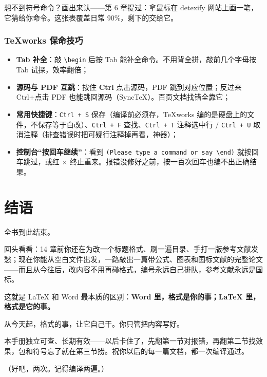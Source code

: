 \begin{notebox}
想不到符号命令？画出来认——第 6 章提过：拿鼠标在 detexify 网站上画一笔，它猜给你命令。这张表覆盖日常 90\%，剩下的交给它。
\end{notebox}

\subsubsection*{TeXworks 保命技巧}

\begin{itemize}
\setlength{\itemsep}{2pt}
\item \textbf{Tab 补全}：敲 \texttt{\textbackslash{}begin} 后按 Tab 能补全命令。不用背全拼，敲前几个字母按 Tab 试探，效率翻倍；
\item \textbf{源码与 PDF 互跳}：按住 \textbf{Ctrl} 点击源码，PDF 跳到对应位置；反过来 Ctrl+点击 PDF 也能跳回源码（SyncTeX）。百页文档找错全靠它；
\item \textbf{常用快捷键}：\texttt{Ctrl + S} 保存（编译前必须存，TeXworks 编的是硬盘上的文件，不保存等于白改）、\texttt{Ctrl + F} 查找、\texttt{Ctrl + T} 注释选中行 / \texttt{Ctrl + U} 取消注释（排查错误时把可疑行注释掉再看，神器）；
\item \textbf{控制台“按回车继续”}：看到 \texttt{(Please type a command or say \textbackslash{}end)} 就按回车跳过，或红 \ensuremath{\times} 终止重来。报错没修好之前，按一百次回车也编不出正确结果。
\end{itemize}

\section*{结语}

全书到此结束。

回头看看：14 章前你还在为改一个标题格式、刷一遍目录、手打一版参考文献发愁；现在你能从空白文件出发，一路敲出一篇带公式、图表和国标文献的完整论文——而且从今往后，改内容不用再碰格式，编号永远自己排队，参考文献永远是国标。

这就是 LaTeX 和 Word 最本质的区别：\textbf{Word 里，格式是你的事；LaTeX 里，格式是它的事。}

从今天起，格式的事，让它自己干。你只管把内容写好。

本手册独立可查、长期有效——以后卡住了，先翻第一节对报错，再翻第二节找效果，包和符号忘了就在第三节捞。祝你以后的每一篇文档，都一次编译通过。

（好吧，两次。记得编译两遍。）
